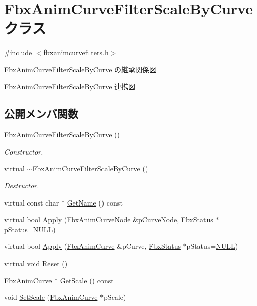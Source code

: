 \hypertarget{class_fbx_anim_curve_filter_scale_by_curve}{}\section{Fbx\+Anim\+Curve\+Filter\+Scale\+By\+Curve クラス}
\label{class_fbx_anim_curve_filter_scale_by_curve}


{\ttfamily \#include $<$fbxanimcurvefilters.\+h$>$}



Fbx\+Anim\+Curve\+Filter\+Scale\+By\+Curve の継承関係図


Fbx\+Anim\+Curve\+Filter\+Scale\+By\+Curve 連携図
\subsection*{公開メンバ関数}
\begin{DoxyCompactItemize}
\item 
\hyperlink{class_fbx_anim_curve_filter_scale_by_curve_a88a350e3639a1fcb3aa29a071fe0fa71}{Fbx\+Anim\+Curve\+Filter\+Scale\+By\+Curve} ()
\begin{DoxyCompactList}\small\item\em Constructor. \end{DoxyCompactList}\item 
virtual \hyperlink{class_fbx_anim_curve_filter_scale_by_curve_a400e5f8cc518a9facd7b2ba452e55a78}{$\sim$\+Fbx\+Anim\+Curve\+Filter\+Scale\+By\+Curve} ()
\begin{DoxyCompactList}\small\item\em Destructor. \end{DoxyCompactList}\item 
virtual const char $\ast$ \hyperlink{class_fbx_anim_curve_filter_scale_by_curve_a99e99cf6db71774d394010c4cd295fdb}{Get\+Name} () const
\item 
virtual bool \hyperlink{class_fbx_anim_curve_filter_scale_by_curve_ac27bdff4d17273d2a767d188436e53f8}{Apply} (\hyperlink{class_fbx_anim_curve_node}{Fbx\+Anim\+Curve\+Node} \&p\+Curve\+Node, \hyperlink{class_fbx_status}{Fbx\+Status} $\ast$p\+Status=\hyperlink{fbxarch_8h_a070d2ce7b6bb7e5c05602aa8c308d0c4}{N\+U\+LL})
\item 
virtual bool \hyperlink{class_fbx_anim_curve_filter_scale_by_curve_a3914c0e65233ce6f2177d5d7e65c15ea}{Apply} (\hyperlink{class_fbx_anim_curve}{Fbx\+Anim\+Curve} \&p\+Curve, \hyperlink{class_fbx_status}{Fbx\+Status} $\ast$p\+Status=\hyperlink{fbxarch_8h_a070d2ce7b6bb7e5c05602aa8c308d0c4}{N\+U\+LL})
\item 
virtual void \hyperlink{class_fbx_anim_curve_filter_scale_by_curve_afa7aab42520287edf327d78dcbbb0d01}{Reset} ()
\item 
\hyperlink{class_fbx_anim_curve}{Fbx\+Anim\+Curve} $\ast$ \hyperlink{class_fbx_anim_curve_filter_scale_by_curve_a966f86d57bd088700341223a85fe27a0}{Get\+Scale} () const
\item 
void \hyperlink{class_fbx_anim_curve_filter_scale_by_curve_afe876ca9b9d674e62b9b7a3839adeef0}{Set\+Scale} (\hyperlink{class_fbx_anim_curve}{Fbx\+Anim\+Curve} $\ast$p\+Scale)
\end{DoxyCompactItemize}
